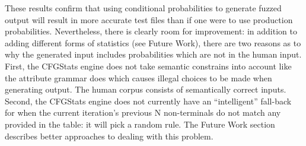 These results confirm that using conditional probabilities to generate fuzzed
output will result in more accurate test files than if one were to use
production probabilities. Nevertheless, there is clearly room for improvement:
in addition to adding different forms of statistics (see Future Work), there
are two reasons as to why the generated input includes probabilities which are
not in the human input. First, the CFGStats engine does not take semantic
constrains into account like the attribute grammar does which causes illegal
choices to be made when generating output. The human corpus consists of
semantically correct inputs. Second, the CFGStats engine does not currently
have an ``intelligent'' fall-back for when the current iteration's previous N
non-terminals do not match any provided in the table: it will pick a random
rule. The Future Work section describes better approaches to dealing with this
problem.

